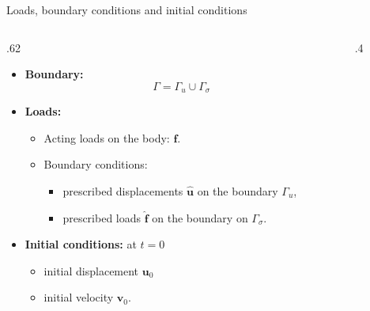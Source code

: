 \documentclass[aspectratio=169]{beamer}
\begin{document}
{\begin{frame}{Loads, boundary conditions and initial conditions}
  \begin{columns}[T]
    \begin{column}{.62\textwidth}
      \begin{itemize}
        \item \textbf{Boundary:} $$\Gamma=\Gamma_{u}\cup\Gamma_{\sigma}$$

        \item \textbf{Loads:}
              \begin{itemize}
                \item Acting loads on the body: $\mathbf f$.
                      \vspace{0.1cm}
                \item Boundary conditions:
                      \begin{itemize}
                        \item prescribed displacements $\mathbf{\hat u}$ on the boundary $\Gamma_{u}$,
                        \item prescribed loads $\mathbf{\hat f}$ on the boundary on $\Gamma_{\sigma}$.
                      \end{itemize}\end{itemize}
              \vspace{0.1cm}
        \item \textbf{Initial conditions:} at $t=0$
              \begin{itemize}
                \item initial displacement $\mathbf u_0$
                \item initial velocity $\mathbf v_0$.
              \end{itemize}
      \end{itemize}
    \end{column}
    \hfill
    \begin{column}{.4\textwidth}
      \begin{center}
\end{center}
\end{column}
\end{columns}
\end{frame}}
\end{document}
